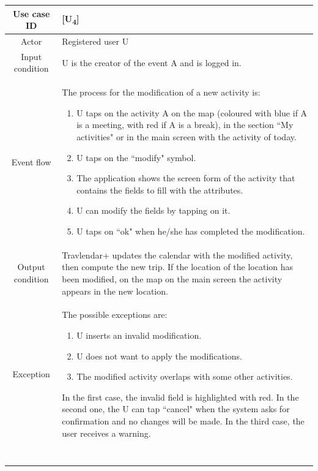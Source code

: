 \documentclass[12pt,titlepage]{article}
\begin{document}
\begin{tabular}{cp{11cm}} 
Use case ID& {[U\textsubscript{4}]}\\ \hline
Actor&Registered user U \\ \hline 
Input condition&U is the creator of the event A and is logged in.\\ \hline
Event flow&The process for the modification of a new activity is: \begin{enumerate}
\item U taps on the activity A on the map (coloured with blue if A is a meeting, with red if A is a break), in the section ``My activities" or in the main screen with the activity of today.
\item U taps on the ``modify" symbol.
\item The application shows the screen form of the activity that contains the fields to fill with the attributes.
\item U can modify the fields by tapping on it.
\item U taps on ``ok" when he/she has completed the modification.

\end{enumerate} \\ \hline
Output condition& Travlendar+ updates the calendar with the modified activity, then compute the new trip. If the location of the location has been modified, on the map on the main screen the activity appears in the new location.
\\ \hline
Exception& The possible exceptions are:
\begin{enumerate}
\item U inserts an invalid modification.
\item U does not want to apply the modifications.
\item The modified activity overlaps with some other activities.
\end{enumerate} 
In the first case, the invalid field is highlighted with red. In the second one, the U can tap ``cancel" when the system asks for confirmation and no changes will be made. In the third case, the user receives a warning.
\\ \hline \

\end{tabular}
\end{document}
